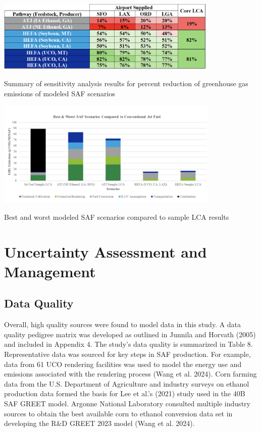 \documentclass[12pt]{article}
\begin{document}
\begin{table}[H]
\centering
\includegraphics[width=0.8\textwidth]{perc.png} %
\caption{Summary of sensitivity analysis results for percent reduction of greenhouse gas emissions of modeled SAF scenarios}
\label{table:perc}
\end{table}

\begin{table}[H]
\centering
\includegraphics[width=0.8\textwidth]{bestworst.png} %
\caption{Best and worst modeled SAF scenarios compared to sample LCA results}
\label{table:perc}
\end{table}

\section{Uncertainty Assessment and Management}

\subsection{Data Quality}

Overall, high quality sources were found to model data in this study. A data quality pedigree matrix was developed as outlined in Junnila and Horvath (2005) and included in Appendix 4. The study’s data quality is summarized in Table 8. Representative data was sourced for key steps in SAF production. For example, data from 61 UCO rendering facilities was used to model the energy use and emissions associated with the rendering process (Wang et al. 2024). Corn farming data from the U.S. Department of Agriculture and industry surveys on ethanol production data formed the basis for Lee et al.’s (2021) study used in the 40B SAF GREET model. Argonne National Laboratory consulted multiple industry sources to obtain the best available corn to ethanol conversion data set in developing the R\&D GREET 2023 model (Wang et al. 2024). 
\end{document}
